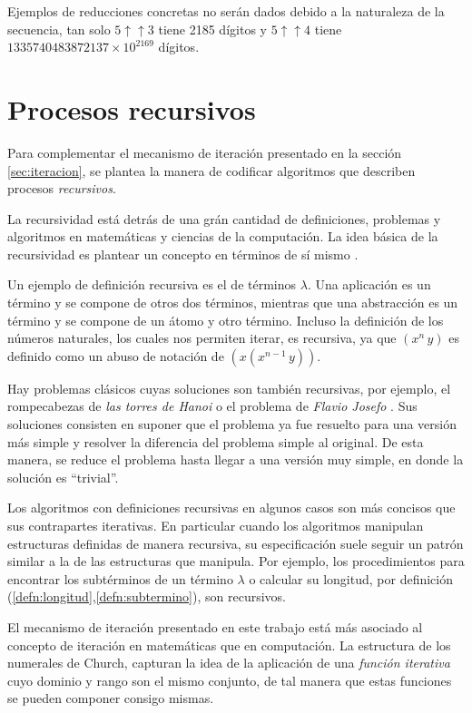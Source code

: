Ejemplos de reducciones concretas no serán dados debido a la naturaleza de la secuencia, tan solo \( 5 \mathbin{\uparrow\uparrow} 3 \) tiene 2185 dígitos y \( 5 \mathbin{\uparrow\uparrow} 4 \) tiene \( 1335740483872137\times 10^{2169} \) dígitos.

\section{Procesos recursivos}
\label{sec:procesos-recursivos}

Para complementar el mecanismo de iteración presentado en la sección \ref{sec:iteracion}, se plantea la manera de codificar algoritmos que describen procesos \emph{recursivos}.

La recursividad está detrás de una grán cantidad de definiciones, problemas y algoritmos en matemáticas y ciencias de la computación. La idea básica de la recursividad es plantear un concepto en términos de sí mismo \cite{knuth:Concrete}.

Un ejemplo de definición recursiva es el de términos \( λ \). Una aplicación es un término y se compone de otros dos términos, mientras que una abstracción es un término y se compone de un átomo y otro término. Incluso la definición de los números naturales, los cuales nos permiten iterar, es recursiva, ya que \( (x^{n}\, y) \) es definido como un abuso de notación de \( (x(x^{n-1}\, y)) \).

Hay problemas clásicos cuyas soluciones son también recursivas, por ejemplo, el rompecabezas de \emph{las torres de Hanoi} o el problema de \emph{Flavio Josefo} \cite{knuth:Concrete}. Sus soluciones consisten en suponer que el problema ya fue resuelto para una versión más simple y resolver la diferencia del problema simple al original. De esta manera, se reduce el problema hasta llegar a una versión muy simple, en donde la solución es ``trivial''.

Los algoritmos con definiciones recursivas en algunos casos son más concisos que sus contrapartes iterativas. En particular cuando los algoritmos manipulan estructuras definidas de manera recursiva, su especificación suele seguir un patrón similar a la de las estructuras que manipula. Por ejemplo, los procedimientos para encontrar los subtérminos de un término \( λ \) o calcular su longitud, por definición (\ref{defn:longitud},\ref{defn:subtermino}), son recursivos.

El mecanismo de iteración presentado en este trabajo está más asociado al concepto de iteración en matemáticas que en computación. La estructura de los numerales de Church, capturan la idea de la aplicación de una \emph{función iterativa} cuyo dominio y rango son el mismo conjunto, de tal manera que estas funciones se pueden componer consigo mismas.


